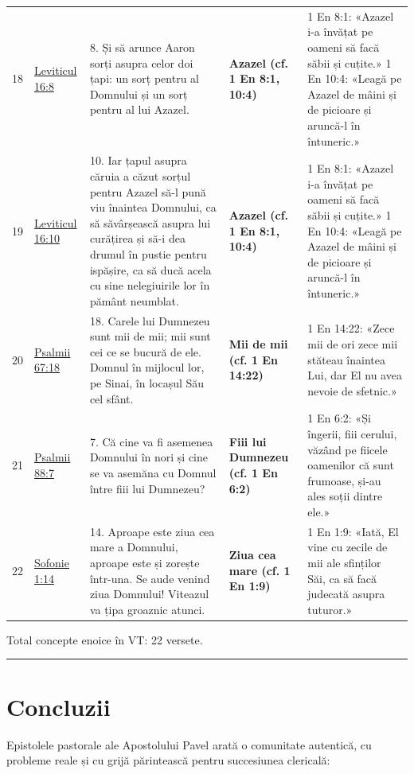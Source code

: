 \documentclass[12pt,a4paper,twoside,openany]{book}
\begin{document}
\begin{longtable}{L{0.8cm}L{0.8cm}L{8.4cm}L{0.9cm}L{3.6cm}}
18 & \href{https://bibliaortodoxa.ro/carte.php?id=47\&cap=16\#8}{Leviticul 16:8} & 8. Și să arunce Aaron sorți asupra celor doi țapi: un sorț pentru al Domnului și un sorț pentru al lui Azazel. & \textbf{Azazel (cf. 1 En 8:1, 10:4)} & 1 En 8:1: «Azazel i-a învățat pe oameni să facă săbii și cuțite.» 1 En 10:4: «Leagă pe Azazel de mâini și de picioare și aruncă-l în întuneric.» \\
19 & \href{https://bibliaortodoxa.ro/carte.php?id=47\&cap=16\#10}{Leviticul 16:10} & 10. Iar țapul asupra căruia a căzut sorțul pentru Azazel să-l pună viu înaintea Domnului, ca să săvârșească asupra lui curățirea și să-i dea drumul în pustie pentru ispășire, ca să ducă acela cu sine nelegiuirile lor în pământ neumblat. & \textbf{Azazel (cf. 1 En 8:1, 10:4)} & 1 En 8:1: «Azazel i-a învățat pe oameni să facă săbii și cuțite.» 1 En 10:4: «Leagă pe Azazel de mâini și de picioare și aruncă-l în întuneric.» \\
20 & \href{https://bibliaortodoxa.ro/carte.php?id=65\&cap=67\#18}{Psalmii 67:18} & 18. Carele lui Dumnezeu sunt mii de mii; mii sunt cei ce se bucură de ele. Domnul în mijlocul lor, pe Sinai, în locașul Său cel sfânt. & \textbf{Mii de mii (cf. 1 En 14:22)} & 1 En 14:22: «Zece mii de ori zece mii stăteau înaintea Lui, dar El nu avea nevoie de sfetnic.» \\
21 & \href{https://bibliaortodoxa.ro/carte.php?id=65\&cap=88\#7}{Psalmii 88:7} & 7. Că cine va fi asemenea Domnului în nori și cine se va asemăna cu Domnul între fiii lui Dumnezeu? & \textbf{Fiii lui Dumnezeu (cf. 1 En 6:2)} & 1 En 6:2: «Și îngerii, fiii cerului, văzând pe fiicele oamenilor că sunt frumoase, și-au ales soții dintre ele.» \\
22 & \href{https://bibliaortodoxa.ro/carte.php?id=73\&cap=1\#14}{Sofonie 1:14} & 14. Aproape este ziua cea mare a Domnului, aproape este și zorește într-una. Se aude venind ziua Domnului! Viteazul va țipa groaznic atunci. & \textbf{Ziua cea mare (cf. 1 En 1:9)} & 1 En 1:9: «Iată, El vine cu zecile de mii ale sfinților Săi, ca să facă judecată asupra tuturor.» \\
\bottomrule
\end{longtable}
\normalsize
Total concepte enoice în VT: 22 versete.


\bigskip\noindent\textcolor{darkred}{\rule{\textwidth}{2pt}}\bigskip

\chapter{Concluzii}\label{concluzie}
Epistolele pastorale ale Apostolului Pavel arată o comunitate autentică, cu probleme reale și cu grijă părintească pentru succesiunea clericală:
\end{document}
